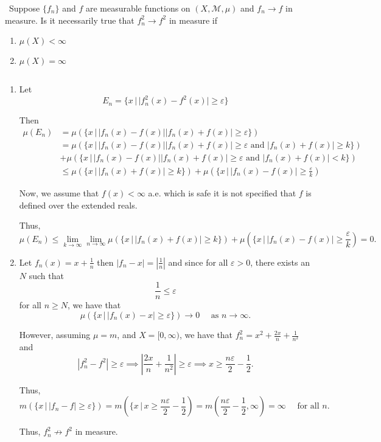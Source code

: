 \documentclass[12pt]{Qual}
\begin{document}
\begin{problem} $\,$
Suppose $\{f_n\}$ and $f$ are measurable functions on $(X,\mathscr{M},\mu)$ and $f_n\to f$ in measure. Is it necessarily true that $f_n^2\to f^2$ in measure if
\begin{enumerate}[label=(\alph*)]
    \item $\mu(X)<\infty$
    \item $\mu(X)=\infty$
\end{enumerate}
\end{problem}


\begin{solution}$\,$
\begin{enumerate}[label=(\alph*)]
    \item Let $$E_n=\{x\,|\,|f_n^2(x)-f^2(x)|\ge\varepsilon\}$$

    Then \begin{align*}
        \mu(E_n)&=\mu(\{x\,|\,|f_n(x)-f(x)||f_n(x)+f(x)|\ge\varepsilon\})\\
        &=\mu(\{x\,|\,|f_n(x)-f(x)||f_n(x)+f(x)|\ge\varepsilon\text{ and }|f_n(x)+f(x)|\ge k\})\\
        &+\mu(\{x\,|\,|f_n(x)-f(x)||f_n(x)+f(x)|\ge\varepsilon\text{ and }|f_n(x)+f(x)|<k\})\\
        &\le\mu(\{x\,|\,|f_n(x)+f(x)|\ge k\})+\mu(\{x\,|\,|f_n(x)-f(x)|\ge\frac{\varepsilon}{k})
    \end{align*}

    Now, we assume that $f(x)<\infty$ a.e. which is safe it is not specified that $f$ is defined over the extended reals.

    Thus, $$\mu(E_n)\le\lim_{k\to\infty}\lim_{n\to\infty}\mu(\{x\,|\,|f_n(x)+f(x)|\ge k\})+\mu(\{x\,|\,|f_n(x)-f(x)|\ge\frac{\varepsilon}{k})=0.$$
    \item Let $f_n(x)=x+\frac{1}{n}$ then $|f_n-x|=|\frac{1}{n}|$ and since for all $\varepsilon>0$, there exists an $N$ such that $$\frac{1}{n}\le\varepsilon$$ for all $n\ge N$, we have that $$\mu(\{x\,|\,|f_n(x)-x|\ge\varepsilon\})\to0\quad\text{ as }n\to\infty.$$

    However, assuming $\mu=m$, and $X=[0,\infty)$, we have that $f_n^2=x^2+\frac{2x}{n}+\frac{1}{n^2}$ and $$|f_n^2-f^2|\ge\varepsilon\implies \left|\frac{2x}{n}+\frac{1}{n^2}\right|\ge\varepsilon\implies x\ge\frac{n\varepsilon}{2}-\frac{1}{2}.$$

    Thus,
     $$m(\{x\,|\,|f_n-f|\ge\varepsilon\})=m\left(\{x\,|\,x\ge\frac{n\varepsilon}{2}-\frac{1}{2}\right)=m\left(\frac{n\varepsilon}{2}-\frac{1}{2},\infty\right)=\infty\quad\text{ for all }n.$$

     Thus, $f_n^2\not\to f^2$ in measure.
\end{enumerate}
\end{solution}
\newpage
\end{document}
